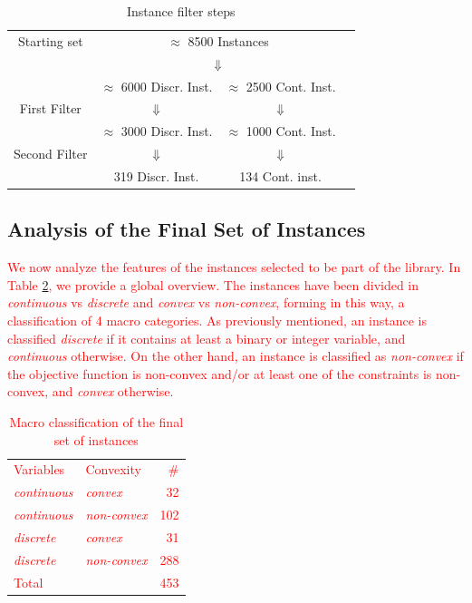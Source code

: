 \begin{table}
 \centering
 \setlength{\tabcolsep}{5pt}
\begin{tabular}{cccc}
Starting set& \multicolumn{ 2}{c}{ $\approx$ 8500 Instances }& \\
& \multicolumn{ 2}{c}{$\Downarrow$}& \\
& $\approx$ 6000 Discr. Inst.  & $\approx$ 2500 Cont. Inst. & \\
First Filter  & $\Downarrow$  & $\Downarrow$ & \\
 & $\approx$ 3000 Discr. Inst.  & $\approx$ 1000 Cont. Inst. & \\
Second Filter & $\Downarrow$  & $\Downarrow$  & \\
  & 319 Discr. Inst.  & 134  Cont. inst. & \\
\end{tabular}
\caption{Instance filter steps} \label{tab:filters}
\end{table}

\subsection{Analysis of the Final Set of Instances}\label{subsec:final set}

\textcolor{red}{We now analyze the features of the instances selected to be part of the
 library. In Table \ref{tab:DDDDD}, we provide a global overview. The instances have been divided in \textit{continuous} vs \textit{discrete} and \textit{convex} vs \textit{non-convex}, forming in this way, a  classification of 4 macro categories. As previously mentioned, an instance is classified \textit{discrete} if it contains at least a binary or integer variable, and \textit{continuous} otherwise. On the other hand, an instance is classified as \textit{non-convex} if the objective function is non-convex and/or at least one of the constraints is  non-convex, and \textit{convex} otherwise. }


\begin{table}
\textcolor{red}{
 \centering
 \setlength{\tabcolsep}{18pt}
 \renewcommand \arraystretch{1.1}
\begin{tabular}{llr}
\toprule
Variables & Convexity & \#\\
\cmidrule(lr){1-3}
%
 \textit{continuous}	& \textit{convex}		&  32 \\[1.2 ex]
 \textit{continuous}	& \textit{non-convex} 	&  102 \\[1.2 ex]
 \textit{discrete}	& \textit{convex}		&  31 \\[1.2 ex]
 \textit{discrete}	& \textit{non-convex}	&  288 \\[1.2 ex]
\cmidrule(lr){1-3}
Total		&				& 453\\
%
\bottomrule
\end{tabular}
\caption{Macro classification of the final set of instances}
\label{tab:DDDDD}
}
\end{table}

